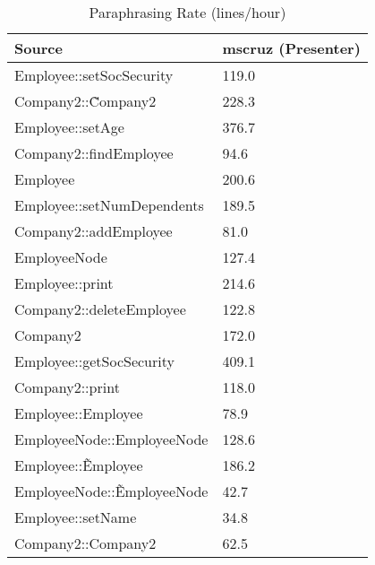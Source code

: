 \begin{table}[hb]
\begin{center}
\begin{tabular}{|l|l|}
\hline
Source & mscruz (Presenter)\\
\hline
Employee::setSocSecurity & 119.0\\
Company2::\~Company2 & 228.3\\
Employee::setAge & 376.7\\
Company2::findEmployee & 94.6\\
Employee & 200.6\\
Employee::setNumDependents & 189.5\\
Company2::addEmployee & 81.0\\
EmployeeNode & 127.4\\
Employee::print & 214.6\\
Company2::deleteEmployee & 122.8\\
Company2 & 172.0\\
Employee::getSocSecurity & 409.1\\
Company2::print & 118.0\\
Employee::Employee & 78.9\\
EmployeeNode::EmployeeNode & 128.6\\
Employee::\~Employee & 186.2\\
EmployeeNode::\~EmployeeNode & 42.7\\
Employee::setName & 34.8\\
Company2::Company2 & 62.5\\
\hline
\end{tabular}
\end{center}
\caption{Paraphrasing Rate (lines/hour)}
\end{table}

